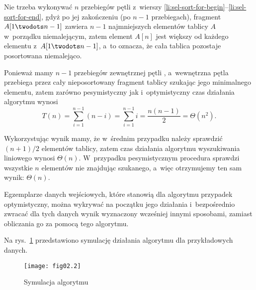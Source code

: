 Nie trzeba wykonywać $n$ przebiegów pętli  z~wierszy \ref{li:sel-sort-for-begin}\nobreakdash--\ref{li:sel-sort-for-end}, gdyż po jej zakończeniu (po $n-1$ przebiegach), fragment $A[1\twodots n-1]$ zawiera $n-1$ najmniejszych elementów tablicy $A$ w~porządku niemalejącym, zatem element $A[n]$ jest większy od każdego elementu z~$A[1\twodots n-1]$, a~to oznacza, że cała tablica pozostaje posortowana niemalejąco.

Ponieważ mamy $n-1$ przebiegów zewnętrznej pętli , a~wewnętrzna pętla  przebiega przez cały nieposortowany fragment tablicy szukając jego minimalnego elementu, zatem zarówno pesymistyczny jak i~optymistyczny czas działania algorytmu wynosi
\[
	T(n) = \sum_{i=1}^{n-1}(n-i) = \sum_{i=1}^{n-1}i = \frac{n(n-1)}{2} = \Theta(n^2).
\]

\exercise %
Wykorzystując wynik  mamy, że w~średnim przypadku należy sprawdzić $(n+1)/2$ elementów tablicy, zatem czas działania algorytmu wyszukiwania liniowego wynosi $\Theta(n)$. W~przypadku pesymistycznym procedura sprawdzi wszystkie $n$ elementów nie znajdując szukanego, a~więc otrzymujemy ten sam wynik: $\Theta(n)$.

\exercise %
Egzemplarze danych wejściowych, które stanowią dla algorytmu przypadek optymistyczny, można wykrywać na początku jego działania i~bezpośrednio zwracać dla tych danych wynik wyznaczony wcześniej innymi sposobami, zamiast obliczania go za pomocą tego algorytmu.


\exercise %
Na rys.~\ref{fig.2.3-1} przedstawiono symulację działania algorytmu  dla przykładowych danych.
\begin{figure}[!ht]
	\begin{center}
		\texttt{[image: fig02.2]}
	\end{center}
	\caption{Symulacja algorytmu } \label{fig.2.3-1}
\end{figure}

